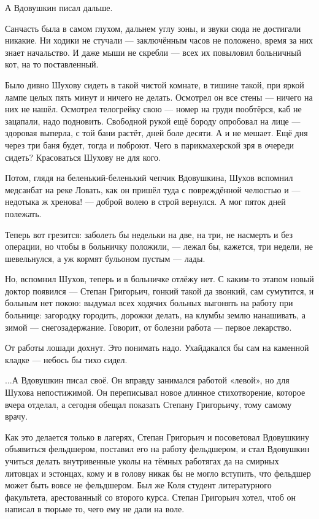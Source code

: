 А Вдовушкин писал дальше.

Санчасть была в самом глухом, дальнем углу зоны, и звуки сюда не достигали никакие. Ни ходики
не стучали --- заключённым часов не положено, время за них знает начальство. И даже мыши не
скребли --- всех их повыловил больничный кот, на то поставленный.

Было дивно Шухову сидеть в такой чистой комнате, в тишине такой, при яркой лампе целых пять
минут и ничего не делать. Осмотрел он все стены --- ничего на них не нашёл. Осмотрел телогрейку
свою --- номер на груди пообтёрся, каб не зацапали, надо подновить. Свободной рукой ещё бороду
опробовал на лице --- здоровая выперла, с той бани растёт, дней боле десяти. А и не мешает. Ещё
дня через три баня будет, тогда и поброют. Чего в парикмахерской зря в очереди сидеть?
Красоваться Шухову не для кого.

Потом, глядя на беленький-беленький чепчик Вдовушкина, Шухов вспомнил медсанбат на реке
Ловать, как он пришёл туда с повреждённой челюстью и --- недотыка ж хренова! --- доброй волею в
строй вернулся. А мог пяток дней полежать.

Теперь вот грезится: заболеть бы недельки на две, на три, не насмерть и без операции, но чтобы
в больничку положили, --- лежал бы, кажется, три недели, не шевельнулся, а уж кормят бульоном
пустым --- лады.

Но, вспомнил Шухов, теперь и в больничке отлёжу нет. С каким-то этапом новый доктор появился
--- Степан Григорьич, гонкий такой да звонкий, сам сумутится, и больным нет покою: выдумал всех
ходячих больных выгонять на работу при больнице: загородку городить, дорожки делать, на
клумбы землю нанашивать, а зимой --- снегозадержание. Говорит, от болезни работа --- первое
лекарство.

От работы лошади дохнут. Это понимать надо. Ухайдакался бы сам на каменной кладке --- небось
бы тихо сидел.

...А Вдовушкин писал своё. Он вправду занимался работой «левой», но для Шухова непостижимой.
Он переписывал новое длинное стихотворение, которое вчера отделал, а сегодня обещал
показать Степану Григорьичу, тому самому врачу.

Как это делается только в лагерях, Степан Григорьич и посоветовал Вдовушкину объявиться
фельдшером, поставил его на работу фельдшером, и стал Вдовушкин учиться делать внутривенные
уколы на тёмных работягах да на смирных литовцах и эстонцах, кому и в голову никак бы не
могло вступить, что фельдшер может быть вовсе не фельдшером. Был же Коля студент
литературного факультета, арестованный со второго курса. Степан Григорьич хотел, чтоб он
написал в тюрьме то, чего ему не дали на воле.

